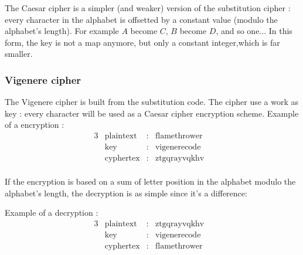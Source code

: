 The Caesar cipher is a simpler (and weaker) version of the substitution cipher : every character in the alphabet is offsetted by a constant value (modulo the alphabet's length). For example $A$ become $C$, $B$ become $D$, and so one... In this form, the key is not a map anymore, but only a constant integer,which is far smaller. 

\newpage
\begin{minipage}[c]{\linewidth}
    
\end{minipage}
\vfill


\subsubsection{ Vigenere cipher }

The  Vigenere cipher is built from the substitution code. The cipher use a work as key : every character will be used as a Caesar cipher encryption scheme. 
Example of a encryption : 
\begin{alignat*}{3}
    &\text{plaintext}   & : & \text{flamethrower}&  \\
    &\text{key}         & : & \text{vigenerecode}&  \\
    &\text{cyphertex}   & : & \text{ztgqrayvqkhv}&  \\ 
\end{alignat*}

If the encryption is based on a sum of letter position in the alphabet modulo the alphabet's length, the decryption is as simple since it's a difference: 

Example of a decryption : 
\begin{alignat*}{3}
    &\text{plaintext}   & : & \text{ztgqrayvqkhv}&  \\
    &\text{key}         & : & \text{vigenerecode}&  \\
    &\text{cyphertex}   & : & \text{flamethrower}&  \\ 
\end{alignat*}

